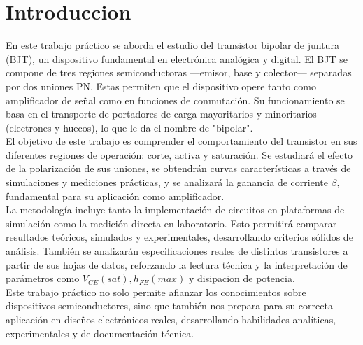 \chapter{Introduccion}

En este trabajo práctico se aborda el estudio del transistor bipolar de juntura (BJT), un dispositivo fundamental en electrónica analógica y digital. El BJT se compone de tres regiones semiconductoras —emisor, base y colector— separadas por dos uniones PN. Estas permiten que el dispositivo opere tanto como amplificador de señal como en funciones de conmutación. Su funcionamiento se basa en el transporte de portadores de carga mayoritarios y minoritarios (electrones y huecos), lo que le da el nombre de "bipolar".\\
El objetivo de este trabajo es comprender el comportamiento del transistor en sus diferentes regiones de operación: corte, activa y saturación. Se estudiará el efecto de la polarización de sus uniones, se obtendrán curvas características a través de simulaciones y mediciones prácticas, y se analizará la ganancia de corriente $\beta$, fundamental para su aplicación como amplificador.\\
La metodología incluye tanto la implementación de circuitos en plataformas de simulación como la medición directa en laboratorio. Esto permitirá comparar resultados teóricos, simulados y experimentales, desarrollando criterios sólidos de análisis. También se analizarán especificaciones reales de distintos transistores a partir de sus hojas de datos, reforzando la lectura técnica y la interpretación de parámetros como $V_{CE}(sat), h_{FE}(max)$ y disipacion de potencia.\\
Este trabajo práctico no solo permite afianzar los conocimientos sobre dispositivos semiconductores, sino que también nos prepara para su correcta aplicación en diseños electrónicos reales, desarrollando habilidades analíticas, experimentales y de documentación técnica.
